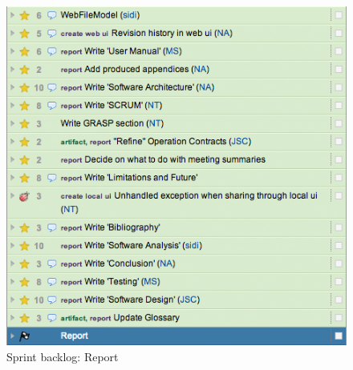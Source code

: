 \begin{figure}[htb]
	\centering
	\includegraphics[width=1\textwidth]{Appendices/graphics/sprint_backlog_3.png}
	\caption{Sprint backlog: Report}
	\label{fig:sprint-backlog-3}
\end{figure}